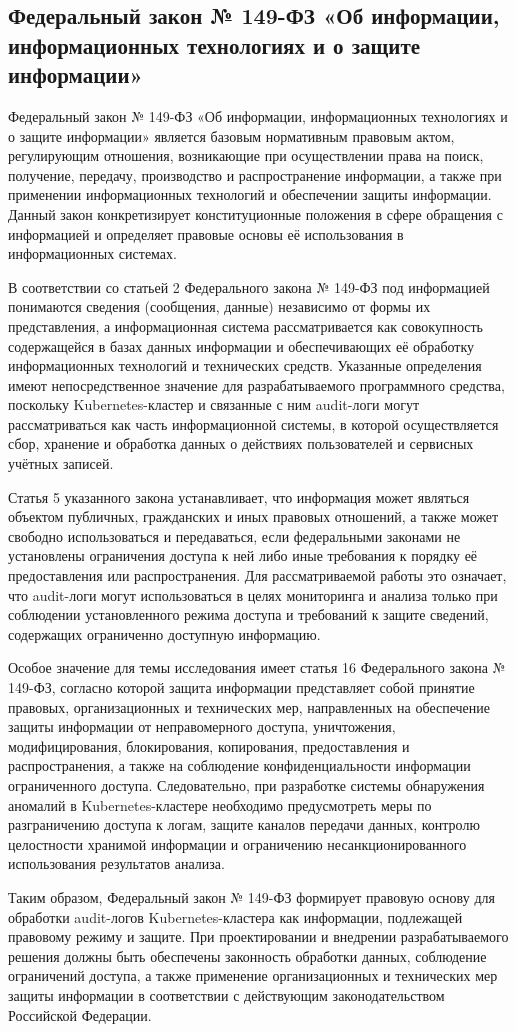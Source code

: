 \subsection{Федеральный закон № 149-ФЗ «Об информации, информационных технологиях и о защите информации»}

Федеральный закон № 149-ФЗ «Об информации, информационных технологиях и о защите информации» \cite{FZ149} является базовым нормативным правовым актом, регулирующим отношения, возникающие при осуществлении права на поиск, получение, передачу, производство и распространение информации, а также при применении информационных технологий и обеспечении защиты информации. Данный закон конкретизирует конституционные положения в сфере обращения с информацией и определяет правовые основы её использования в информационных системах.

В соответствии со статьей 2 Федерального закона № 149-ФЗ под информацией понимаются сведения (сообщения, данные) независимо от формы их представления, а информационная система рассматривается как совокупность содержащейся в базах данных информации и обеспечивающих её обработку информационных технологий и технических средств. Указанные определения имеют непосредственное значение для разрабатываемого программного средства, поскольку Kubernetes-кластер и связанные с ним audit-логи могут рассматриваться как часть информационной системы, в которой осуществляется сбор, хранение и обработка данных о действиях пользователей и сервисных учётных записей.

Статья 5 указанного закона устанавливает, что информация может являться объектом публичных, гражданских и иных правовых отношений, а также может свободно использоваться и передаваться, если федеральными законами не установлены ограничения доступа к ней либо иные требования к порядку её предоставления или распространения. Для рассматриваемой работы это означает, что audit-логи могут использоваться в целях мониторинга и анализа только при соблюдении установленного режима доступа и требований к защите сведений, содержащих ограниченно доступную информацию.

Особое значение для темы исследования имеет статья 16 Федерального закона № 149-ФЗ, согласно которой защита информации представляет собой принятие правовых, организационных и технических мер, направленных на обеспечение защиты информации от неправомерного доступа, уничтожения, модифицирования, блокирования, копирования, предоставления и распространения, а также на соблюдение конфиденциальности информации ограниченного доступа. Следовательно, при разработке системы обнаружения аномалий в Kubernetes-кластере необходимо предусмотреть меры по разграничению доступа к логам, защите каналов передачи данных, контролю целостности хранимой информации и ограничению несанкционированного использования результатов анализа.

Таким образом, Федеральный закон № 149-ФЗ формирует правовую основу для обработки audit-логов Kubernetes-кластера как информации, подлежащей правовому режиму и защите. При проектировании и внедрении разрабатываемого решения должны быть обеспечены законность обработки данных, соблюдение ограничений доступа, а также применение организационных и технических мер защиты информации в соответствии с действующим законодательством Российской Федерации.